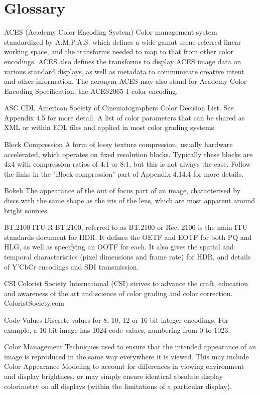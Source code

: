 \chapter{Glossary}%
\label{ch:glossary}

ACES (Academy Color Encoding System)
Color management system standardized by A.M.P.A.S. which defines a wide gamut scene-referred linear working space, and the transforms needed to map to that from other color encodings. ACES also defines the transforms to display ACES image data on various standard displays, as well as metadata to communicate creative intent and other information. The acronym ACES may also stand for Academy Color Encoding Specification, the ACES2065-1 color encoding.

ASC CDL
American Society of Cinematographers Color Decision List. See Appendix 4.5 for more detail. A list of color parameters that can be shared as XML or within EDL files and applied in most color grading systems.

Block Compression
A form of lossy texture compression, usually hardware accelerated, which operates on fixed resolution blocks. Typically these blocks are 4x4 with compression ratios of 4:1 or 8:1, but this is not always the case. Follow the links in the "Block compression" part of Appendix 4.14.4 for more details.

Bokeh
The appearance of the out of focus part of an image, characterised by discs with the same shape as the iris of the lens, which are most apparent around bright sources.

BT.2100
ITU-R BT.2100, referred to as BT.2100 or Rec. 2100 is the main ITU standards document for HDR. It defines the OETF and EOTF for both PQ and HLG, as well as specifying an OOTF for each. It also gives the spatial and temporal characteristics (pixel dimensions and frame rate) for HDR, and details of Y'CbCr encodings and SDI transmission.

CSI
Colorist Society International (CSI) strives to advance the craft, education and awareness of the art and science of color grading and color correction. ColoristSociety.com

Code Values
Discrete values for 8, 10, 12 or 16 bit integer encodings. For example, a 10 bit image has 1024 code values, numbering from 0 to 1023.

Color Management
Techniques used to ensure that the intended appearance of an image is reproduced in the same way everywhere it is viewed. This may include Color Appearance Modeling to account for differences in viewing environment and display brightness, or may simply ensure identical absolute display colorimetry on all displays (within the limitations of a particular display).

